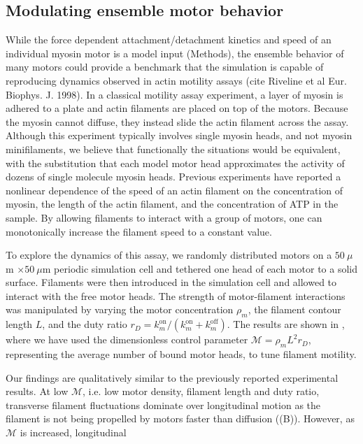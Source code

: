 \documentclass[11pt]{article}
\begin{document}
\subsection*{Modulating ensemble motor behavior}
While the force dependent attachment/detachment kinetics and speed of an individual myosin motor is {\color{red}a model input} (Methods), the ensemble behavior of many
motors could provide a benchmark that the simulation is {\color{red}capable of reproducing dynamics observed in actin motility}
assays {\color{blue}\cite{walcott2012} (cite Riveline et al Eur. Biophys. J. 1998)}. {\color{red}In a classical} motility assay experiment, a layer of myosin is
adhered to a plate and actin filaments are placed on top of the {\color{red}motors}. Because the myosin cannot diffuse, they instead
slide the actin filament across the assay.
Although this experiment typically involves single myosin heads, and not myosin minifilaments, we believe that
functionally the situations would be equivalent, with the substitution that each model motor head approximates the
activity of dozens of single molecule myosin heads. 
{\color{red}Previous experiments} \cite{harris1993, umemoto1990} {\color{red}have reported} a nonlinear dependence of the speed of an 
actin filament on the concentration of myosin, the length of
the actin filament, and the concentration of ATP in the sample. By allowing filaments to interact with {\color{red}a group of} motors, one
can monotonically increase the filament speed to a {\color{red}constant value}. 
\par
To explore {\color{red}the dynamics of} this {\color{red}assay}, we randomly distributed motors on a $50\ \mu$m $\times 50\ \mu$m periodic simulation cell and
{\color{red}tethered} one head of each motor to {\color{red}a solid surface}. Filaments were {\color{red}then introduced} in the simulation cell and 
allowed to interact with the {\color{red}free} motor heads. The {\color{red}strength} of motor-filament interactions was manipulated by varying the motor concentration $\rho_m$, the filament contour length $L$, and the duty ratio $r_D =
k_m^\text{on}/(k_m^\text{on}+k_m^\text{off})$. 
The results are shown in , where we have used the dimensionless {\color{red}control} parameter $\mathcal{M}=\rho_m L^2 r_D$, {\color{red}representing the average number of bound motor heads,} to {\color{red}tune filament motility}. 
\par
{\color{red}Our} findings are qualitatively similar to the {\color{red}previously reported} experimental results. 
{\color{red}At low $\mathcal{M}$, i.e.} low motor density, filament length and duty ratio, transverse filament fluctuations dominate over longitudinal motion as the filament is not being propelled by motors faster than diffusion ({\color{red}(B)}). However, as {\color{red}$\mathcal{M}$ is} increased, longitudinal
\end{document}
